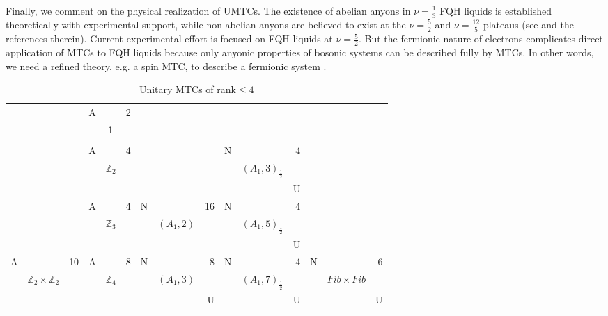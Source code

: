 \documentclass[12pt,psamsfonts]{amsart}
\newcommand{\Z}{\mathbb Z}
\numberwithin{equation}{section}
\theoremstyle{definition}
\begin{document}
Finally, we comment on the physical realization of UMTCs. The
existence of abelian anyons in $\nu=\frac{1}{3}$ FQH liquids is
established theoretically with experimental support, while
non-abelian anyons are believed to exist at the $\nu=\frac{5}{2}$
and $\nu=\frac{12}{5}$ plateaus (see \cite{DFN} and the
references therein). Current experimental effort is focused on FQH
liquids at $\nu=\frac{5}{2}$.  But the fermionic nature of
electrons complicates direct application of MTCs to FQH liquids
because only anyonic properties of bosonic systems can be
described fully by MTCs.  In other words, we need a refined
theory, e.g. a spin MTC, to describe a fermionic system
\cite{DW}\cite{BM}.


\begin{table}\caption{Unitary MTCs of rank$\leq4$}\label{rank4table}
\begin{tabular}{|lcr|lcr|lcr|lcr|lcr|}

\hline
 & & & A& & 2& &              &  & &            & & & & \\
 & & & &\;\;\;\;\bf{1} \;\;\;\;& &   &       &   & &            & & & & \\
 & & & &    & &   &              &   & &            & & & & \\
\hline
 & & &A&   &4&  &              &  &N&            &4& & & \\
 & & & &\;\;\;\;\bf{$\Z_2$} \;\;\;\;& &   &  &   & &\bf{$(A_1,3)_{\frac{1}{2}}$}& & & & \\
& & & &    & &   &              &   & &            &U& & & \\
\hline
 & & &A&   &4& N &              &  16&N&            &4& & & \\
 & & & &\;\;\;\;\bf{$\Z_3$}\;\;\;\;& &   & \bf{$(A_1,2)$} &   & &\bf{$(A_1,5)_{\frac{1}{2}}$}& & & & \\
& & & &    & &   &              &   & &            &U& & & \\
\hline
A& &10&A&   &8& N &              &  8&N&            &4&N& & 6\\
 &\bf{$\Z_2\times \Z_2$}& & &\;\;\;\;\bf{$\Z_4$}\;\;\;\;& &   & \bf{$(A_1,3)$} &   & &\bf{$(A_1,7)_{\frac{1}{2}}$}& & &\bf{$Fib\times Fib$}& \\
& & & &    & &   &              &   U& &            &U& & &U \\
 \hline
\end{tabular}
\end{table}
\end{document}
